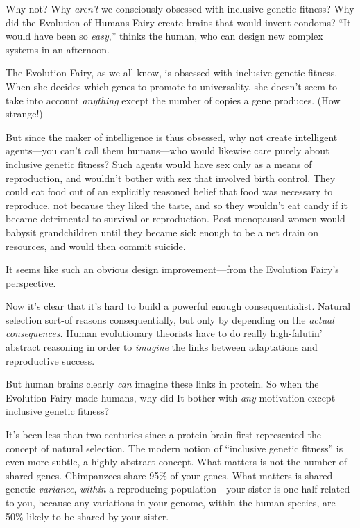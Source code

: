 {{
 Why not? Why \textit{aren't} we consciously
obsessed with inclusive genetic fitness? Why did the
Evo\-lu\-tion-of-Hu\-mans Fairy create brains that would invent condoms?
``It would have been so
\textit{easy},'' thinks the human, who can design new
complex systems in an afternoon.}

{
 The Evolution Fairy, as we all know, is obsessed with inclusive
genetic fitness. When she decides which genes to promote to
universality, she doesn't seem to take into account
\textit{anything} except the number of copies a gene produces. (How
strange!)}

{
 But since the maker of intelligence is thus obsessed, why not
create intelligent agents---you can't call them
humans---who would likewise care purely about inclusive genetic
fitness? Such agents would have sex only as a means of reproduction,
and wouldn't bother with sex that involved birth
control. They could eat food out of an explicitly reasoned belief that
food was necessary to reproduce, not because they liked the taste, and
so they wouldn't eat candy if it became detrimental to
survival or reproduction. Post-menopausal women would babysit
grandchildren until they became sick enough to be a net drain on
resources, and would then commit suicide.}

{
 It seems like such an obvious design improvement---from the
Evolution Fairy's perspective.}

{
 Now it's clear that it's hard to
build a powerful enough consequentialist. Natural selection sort-of
reasons consequentially, but only by depending on the \textit{actual
consequences.} Human evolutionary theorists have to do really
high-falutin' abstract reasoning in order to
\textit{imagine} the links between adaptations and reproductive
success.}

{
 But human brains clearly \textit{can} imagine these links in
protein. So when the Evolution Fairy made humans, why did It bother
with \textit{any} motivation except inclusive genetic fitness?}

{
 It's been less than two centuries since a protein
brain first represented the concept of natural selection. The modern
notion of ``inclusive genetic
fitness'' is even more subtle, a highly abstract
concept. What matters is not the number of shared genes. Chimpanzees
share 95\% of your genes. What matters is shared genetic
\textit{variance}, \textit{within} a reproducing population---your
sister is one-half related to you, because any variations in your
genome, within the human species, are 50\% likely to be shared by your
sister.}

}
